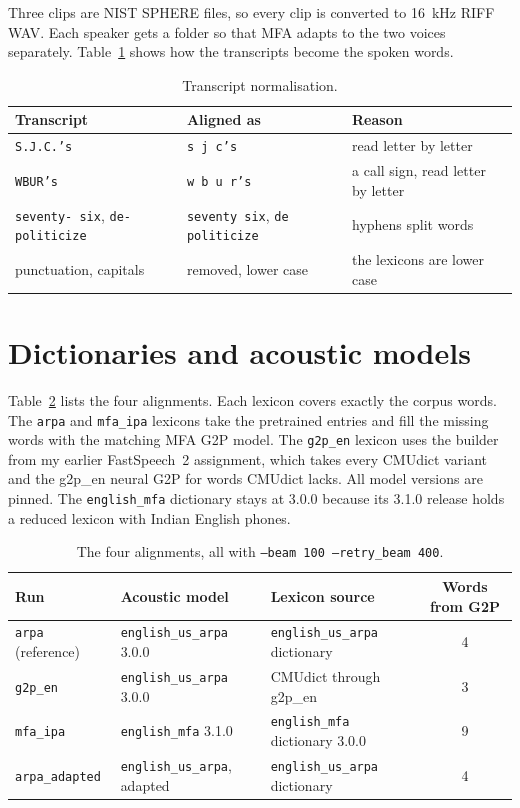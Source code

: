 \documentclass[11pt,a4paper]{article}
\newcommand{\code}[1]{\texttt{#1}}
\begin{document}
Three clips are NIST SPHERE files, so every clip is converted to 16~kHz RIFF WAV. Each speaker gets a folder so that
MFA adapts to the two voices separately. Table~\ref{tab:norm} shows how the transcripts become the spoken words.

\begin{table}[htbp]
\centering\small
\caption{Transcript normalisation.}
\label{tab:norm}
\begin{tabular}{lll}
\toprule
Transcript & Aligned as & Reason \\
\midrule
\code{S.J.C.'s} & \code{s j c's} & read letter by letter \\
\code{WBUR's} & \code{w b u r's} & a call sign, read letter by letter \\
\code{seventy- six}, \code{de-politicize} & \code{seventy six}, \code{de politicize} & hyphens split words \\
punctuation, capitals & removed, lower case & the lexicons are lower case \\
\bottomrule
\end{tabular}
\end{table}

\section{Dictionaries and acoustic models}

Table~\ref{tab:runs} lists the four alignments. Each lexicon covers exactly the corpus words. The \code{arpa} and
\code{mfa\_ipa} lexicons take the pretrained entries and fill the missing words with the matching MFA G2P model. The
\code{g2p\_en} lexicon uses the builder from my earlier FastSpeech~2 assignment, which takes every CMUdict variant and
the g2p\_en neural G2P for words CMUdict lacks. All model versions are pinned. The \code{english\_mfa} dictionary stays
at 3.0.0 because its 3.1.0 release holds a reduced lexicon with Indian English phones.

\begin{table}[htbp]
\centering\small
\caption{The four alignments, all with \code{--beam 100 --retry\_beam 400}.}
\label{tab:runs}
\begin{tabular}{lllc}
\toprule
Run & Acoustic model & Lexicon source & Words from G2P \\
\midrule
\code{arpa} (reference) & \code{english\_us\_arpa} 3.0.0 & \code{english\_us\_arpa} dictionary & 4 \\
\code{g2p\_en} & \code{english\_us\_arpa} 3.0.0 & CMUdict through g2p\_en & 3 \\
\code{mfa\_ipa} & \code{english\_mfa} 3.1.0 & \code{english\_mfa} dictionary 3.0.0 & 9 \\
\code{arpa\_adapted} & \code{english\_us\_arpa}, adapted & \code{english\_us\_arpa} dictionary & 4 \\
\bottomrule
\end{tabular}
\end{table}
\end{document}
